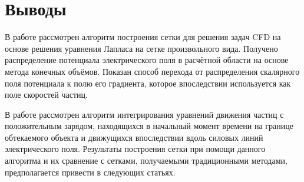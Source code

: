\documentclass[a4paper,12pt]{article}
\begin{document}
\section{Выводы}

В работе рассмотрен алгоритм построения сетки для решения задач CFD на основе  решения уравнения Лапласа на сетке произвольного вида. Получено распределение потенциала электрического поля в расчётной области на основе метода конечных объёмов. Показан способ перехода от распределения скалярного поля потенциала к полю его градиента, которое впоследствии используется как поле скоростей частиц.

В работе рассмотрен алгоритм интегрирования уравнений движения частиц с положительным зарядом, находящихся в начальный момент времени на границе обтекаемого объекта и движущихся впоследствии вдоль силовых линий электрического поля. Результаты построения сетки при помощи данного алгоритма и их сравнение с сетками, получаемыми традиционными методами, предполагается привести в следующих статьях.

\nocite{кудрявцев2010краткий}
\nocite{ландау2001теоретическая}

\printbibliography
\end{document}
